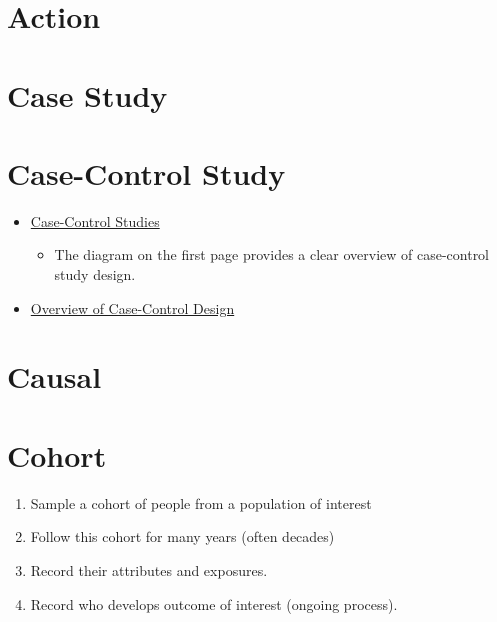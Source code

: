 \documentclass[]{book}
\providecommand{\tightlist}{%
  \setlength{\itemsep}{0pt}\setlength{\parskip}{0pt}}
\begin{document}
\hypertarget{action}{%
\section{Action}\label{action}}

\hypertarget{case-study}{%
\section{Case Study}\label{case-study}}

\hypertarget{case-control-study}{%
\section{Case-Control Study}\label{case-control-study}}

\begin{itemize}
\tightlist
\item
  \href{https://sph.unc.edu/files/2015/07/nciph_ERIC5.pdf}{Case-Control Studies}

  \begin{itemize}
  \tightlist
  \item
    The diagram on the first page provides a clear overview of case-control study design.
  \end{itemize}
\item
  \href{http://sphweb.bumc.bu.edu/otlt/MPH-Modules/EP/EP713_Case-Control/EP713_Case-Control_print.html}{Overview of Case-Control Design}
\end{itemize}

\hypertarget{causal}{%
\section{Causal}\label{causal}}

\hypertarget{cohort}{%
\section{Cohort}\label{cohort}}

\begin{enumerate}
\def\labelenumi{\arabic{enumi}.}
\tightlist
\item
  Sample a cohort of people from a population of interest
\item
  Follow this cohort for many years (often decades)
\item
  Record their attributes and exposures.
\item
  Record who develops outcome of interest (ongoing process).
\end{enumerate}
\end{document}
